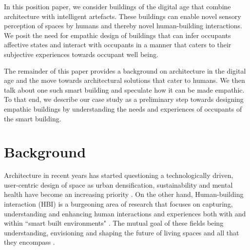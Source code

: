 \documentclass[manuscript, anonymous, review]{acmart}
\begin{document}
In this position paper, we consider buildings of the digital age that combine architecture with intelligent artefacts. These buildings can enable novel sensory perception of spaces by humans and thereby novel human-building interactions. We posit the need for empathic design of buildings that can infer occupants affective states and interact with occupants in a manner that caters to their subjective experiences towards occupant well being. 

The remainder of this paper provides a background on architecture in the digital age and the move towards architectural solutions that cater to humans. We then talk about one such smart building and speculate how it can be made empathic. To that end, we describe our case study as a preliminary step towards designing empathic buildings by understanding the needs and experiences of occupants of the smart building. 




\section{Background}
Architecture in recent years has started questioning a technologically driven, user-centric design of space as urban densification, sustainability and mental health have become an increasing priority \cite{derix2014empathic}. On the other hand, Human-building interaction (HBI) is a burgeoning area of research that focuses on capturing, understanding and enhancing human interactions and experiences both with and within ``smart built environments" \cite{alavi2016future}. The mutual goal of these fields being  understanding,  envisioning and shaping the future of living spaces and all that they encompass \cite{nembrini2017human, alavi2018artifacts}. 
\end{document}
